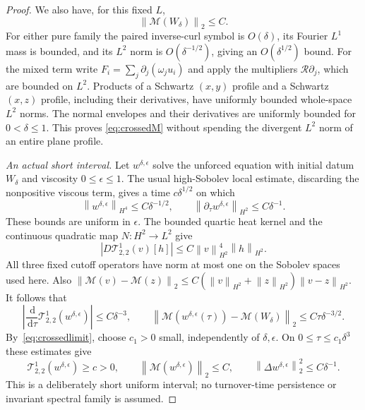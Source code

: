\documentclass[11pt]{article}
\newcommand{\dd}{\,\mathrm d}
\newcommand{\norm}[1]{\left\lVert#1\right\rVert}
\begin{document}
\begin{proof}
We also have, for this fixed $L$,
\begin{equation}\label{eq:crossedM}
 \norm{\mathcal M(W_\delta)}_2\leq C.
\end{equation}
For either pure family the paired inverse-curl symbol is $O(\delta)$,
its Fourier $L^1$ mass is bounded, and its $L^2$ norm is
$O(\delta^{-1/2})$, giving an $O(\delta^{1/2})$ bound.
For the mixed term write
$F_i=\sum_j\partial_j(\omega_j u_i)$ and apply the multipliers
$\mathcal R\partial_j$, which are bounded on $L^2$.
Products of a Schwartz $(x,y)$ profile and a Schwartz $(x,z)$
profile, including their derivatives, have uniformly bounded
whole-space $L^2$ norms. The normal envelopes and their derivatives
are uniformly bounded for $0<\delta\leq1$. This proves
\eqref{eq:crossedM} without spending the divergent $L^2$ norm of
an entire plane profile.

\emph{An actual short interval.}
Let $w^{\delta,\epsilon}$ solve the unforced equation with initial
datum $W_\delta$ and viscosity $0\leq\epsilon\leq1$.
The usual high-Sobolev local estimate, discarding the nonpositive
viscous term, gives a time $c\delta^{1/2}$ on which
\[
 \norm{w^{\delta,\epsilon}}_{H^4}\leq C\delta^{-1/2},
 \qquad
 \norm{\partial_\tau w^{\delta,\epsilon}}_{H^2}\leq C\delta^{-1}.
\]
These bounds are uniform in $\epsilon$. The bounded quartic heat
kernel and the continuous quadratic map $N:H^2\to L^2$ give
\[
 |D\mathcal T_{2,2}^1(v)[h]|
      \leq C\norm v_{H^2}^4\norm h_{H^2}.
\]
All three fixed cutoff operators have norm at most one on the
Sobolev spaces used here. Also
$\norm{\mathcal M(v)-\mathcal M(z)}_2
 \leq C(\norm v_{H^2}+\norm z_{H^2})\norm{v-z}_{H^2}$.
It follows that
\[
 \left|\frac{\dd}{\dd\tau}\mathcal T_{2,2}^1(w^{\delta,\epsilon})\right|
       \leq C\delta^{-3},\qquad
 \norm{\mathcal M(w^{\delta,\epsilon}(\tau))
                  -\mathcal M(W_\delta)}_2
       \leq C\tau\delta^{-3/2}.
\]
By~\eqref{eq:crossedlimit}, choose $c_1>0$ small, independently
of $\delta,\epsilon$. On $0\leq\tau\leq c_1\delta^3$ these estimates give
\begin{equation}\label{eq:crossedwindow}
 \mathcal T_{2,2}^1(w^{\delta,\epsilon})\geq c>0,\qquad
 \norm{\mathcal M(w^{\delta,\epsilon})}_2\leq C,\qquad
 \norm{\Delta w^{\delta,\epsilon}}_2^2\leq C\delta^{-1}.
\end{equation}
This is a deliberately short uniform interval; no turnover-time
persistence or invariant spectral family is assumed.


\end{proof}
\end{document}
